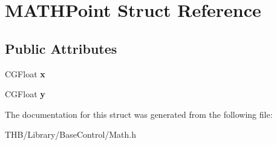 \hypertarget{struct_m_a_t_h_point}{}\section{M\+A\+T\+H\+Point Struct Reference}
\label{struct_m_a_t_h_point}
\subsection*{Public Attributes}
\begin{DoxyCompactItemize}
\item 
\mbox{\label{struct_m_a_t_h_point_a260b6c5bf423f07dae9fb6e67961cd0f}} 
C\+G\+Float {\bfseries x}
\item 
\mbox{\label{struct_m_a_t_h_point_a58d37ddeacd3cbf67227b0bc14c443f3}} 
C\+G\+Float {\bfseries y}
\end{DoxyCompactItemize}


The documentation for this struct was generated from the following file\+:\begin{DoxyCompactItemize}
\item 
T\+H\+B/\+Library/\+Base\+Control/Math.\+h\end{DoxyCompactItemize}
